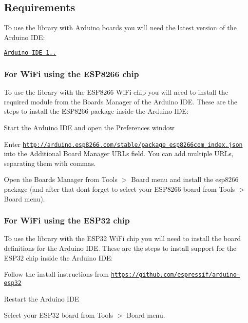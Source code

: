 \subsection*{Requirements}

To use the library with Arduino boards you will need the latest version of the Arduino I\+DE\+:


\begin{DoxyItemize}
\item \href{http://arduino.cc/en/main/software}{\tt Arduino I\+DE 1..}
\end{DoxyItemize}

\subsubsection*{For Wi\+Fi using the E\+S\+P8266 chip}

To use the library with the E\+S\+P8266 Wi\+Fi chip you will need to install the required module from the Boards Manager of the Arduino I\+DE. These are the steps to install the E\+S\+P8266 package inside the Arduino I\+DE\+:


\begin{DoxyEnumerate}
\item Start the Arduino I\+DE and open the Preferences window
\item Enter {\ttfamily \href{http://arduino.esp8266.com/stable/package_esp8266com_index.json}{\tt http\+://arduino.\+esp8266.\+com/stable/package\+\_\+esp8266com\+\_\+index.\+json}} into the Additional Board Manager U\+R\+Ls field. You can add multiple U\+R\+Ls, separating them with commas.
\item Open the Boards Manager from Tools $>$ Board menu and install the esp8266 package (and after that don\textquotesingle{}t forget to select your E\+S\+P8266 board from Tools $>$ Board menu).
\end{DoxyEnumerate}

\subsubsection*{For Wi\+Fi using the E\+S\+P32 chip}

To use the library with the E\+S\+P32 Wi\+Fi chip you will need to install the board definitions for the Arduino I\+DE. These are the steps to install support for the E\+S\+P32 chip inside the Arduino I\+DE\+:


\begin{DoxyEnumerate}
\item Follow the install instructions from \href{https://github.com/espressif/arduino-esp32}{\tt https\+://github.\+com/espressif/arduino-\/esp32}
\item Restart the Arduino I\+DE
\item Select your E\+S\+P32 board from Tools $>$ Board menu.
\end{DoxyEnumerate}

